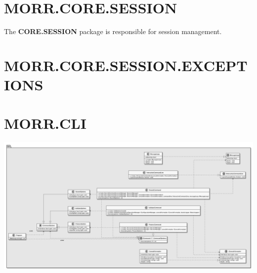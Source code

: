\begin{packclass}
\end{packclass}

\section*{MORR.CORE.SESSION}

The \textbf{CORE.SESSION} package is responsible for session management.

\begin{packif}
\end{packif}

\begin{packclass}
\end{packclass}

\begin{packpack}
\end{packpack}

\section*{MORR.CORE.SESSION.EXCEPTIONS}

\begin{packclass}
\end{packclass}

\newpage
\section{MORR.CLI}

\begin{center}
    \includegraphics[width=1.0\textwidth]{resources/Packages/CLI.png}
\end{center}

